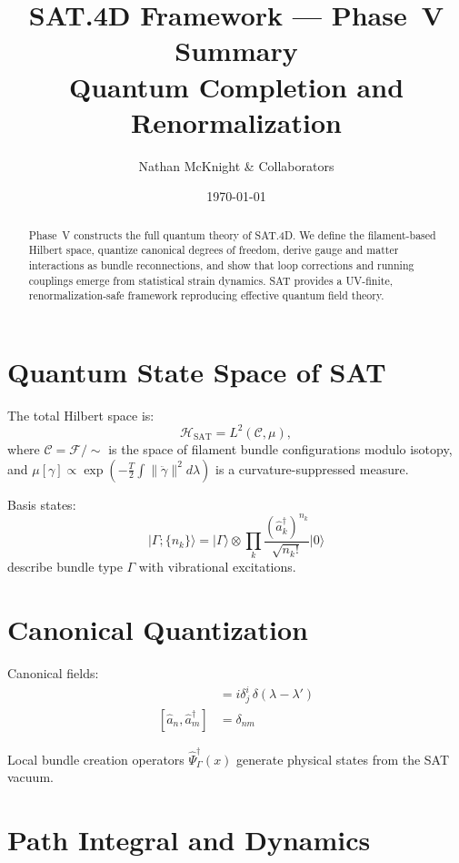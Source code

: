 \documentclass[11pt]{article}
\title{\textbf{SAT.4D Framework --- Phase~V Summary}\\Quantum Completion and Renormalization}
\author{Nathan McKnight \& Collaborators}
\date{\today}
\begin{document}
\maketitle

\begin{abstract}
Phase~V constructs the full quantum theory of SAT.4D. We define the filament-based Hilbert space, quantize canonical degrees of freedom, derive gauge and matter interactions as bundle reconnections, and show that loop corrections and running couplings emerge from statistical strain dynamics. SAT provides a UV-finite, renormalization-safe framework reproducing effective quantum field theory.
\end{abstract}

\tableofcontents

\section{Quantum State Space of SAT}

The total Hilbert space is:
\[
\mathcal{H}_{\text{SAT}} = L^2(\mathcal{C}, \mu),
\]
where \( \mathcal{C} = \mathcal{F}/\sim \) is the space of filament bundle configurations modulo isotopy, and \( \mu[\gamma] \propto \exp(-\tfrac{T}{2} \int \|\ddot\gamma\|^2 d\lambda) \) is a curvature-suppressed measure.

Basis states:
\[
|\Gamma; \{n_k\}\rangle = |\Gamma\rangle \otimes \prod_k \frac{(\hat{a}_k^\dagger)^{n_k}}{\sqrt{n_k!}} |0\rangle
\]
describe bundle type \( \Gamma \) with vibrational excitations.

\section{Canonical Quantization}

Canonical fields:
\begin{align*}
[\hat{\xi}^i(\lambda), \hat{\pi}_j(\lambda')] &= i\delta^i_j\,\delta(\lambda - \lambda') \\
[\hat{a}_n, \hat{a}^\dagger_m] &= \delta_{nm}
\end{align*}

Local bundle creation operators \( \hat{\Psi}^\dagger_\Gamma(x) \) generate physical states from the SAT vacuum.

\section{Path Integral and Dynamics}
\end{document}
